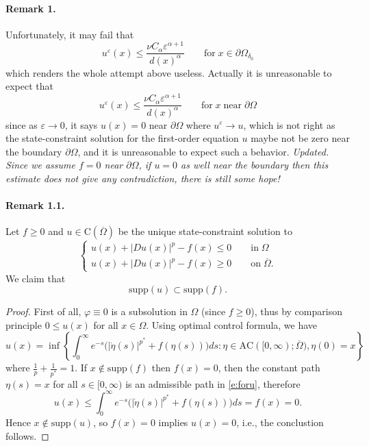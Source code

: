\documentclass[10pt]{article}
\theoremstyle{plain}
\theoremstyle{remark}
\begin{document}
\paragraph{Remark 1.} Unfortunately, it may fail that
\begin{equation*}
    u^\varepsilon(x) \leq  \frac{\nu C_\alpha \varepsilon^{\alpha+1}}{d(x)^\alpha} \qquad\text{for}\;x\in \partial\Omega_{\delta_0}
\end{equation*}
which renders the whole attempt above useless. Actually it is unreasonable to expect that
\begin{equation*}
    u^\varepsilon(x)\leq \frac{\nu C_\alpha \varepsilon^{\alpha+1}}{d(x)^\alpha} \qquad\text{for}\;x\;\text{near}\;\partial \Omega
\end{equation*}
since as $\varepsilon\to 0$, it says $u(x) = 0$ near $\partial\Omega$ where $u^\varepsilon\to u$, which is not right as the state-constraint solution for the first-order equation $u$ maybe not be zero near the boundary $\partial\Omega$, and it is unreasonable to expect such a behavior. \emph{Updated. Since we assume $f = 0$ near $\partial\Omega$, if $u = 0$ as well near the boundary then this estimate does not give any contradiction, there is still some hope!}

\paragraph{Remark 1.1.} Let $f\geq 0$ and $u\in \mathrm{C}(\overline{\Omega})$ be the unique state-constraint solution to
\begin{equation*}
    \begin{cases}
       u(x) + |Du(x)|^p - f(x) \leq 0 \qquad\text{in}\;\Omega\\
       u(x) + |Du(x)|^p - f(x) \geq 0 \qquad\text{on}\;\overline{\Omega}.
    \end{cases}
\end{equation*}
We claim that 
\begin{equation*}
    \mathrm{supp}(u)\subset \mathrm{supp}(f).
\end{equation*}
\begin{proof} First of all, $\varphi \equiv 0$ is a subsolution in $\Omega$ (since $f\geq 0$), thus by comparison principle $0\leq u(x)$ for all $x\in \Omega$. Using optimal control formula, we have
\begin{equation}\label{e:foru}
    u(x) = \inf \left\lbrace \int_0^\infty e^{-s}\Big(|\dot{\eta}(s)|^{p^*} +f(\eta(s))\Big)ds: \eta\in \mathrm{AC}([0,\infty);\overline{\Omega}), \eta(0) = x\right\rbrace
\end{equation}
where $\frac{1}{p} + \frac{1}{p^*} = 1$. If $x\notin \mathrm{supp}(f)$ then $f(x) = 0$, then the constant path $\eta(s) = x$ for all $s\in [0,\infty)$ is an admissible path in \eqref{e:foru}, therefore
\begin{equation*}
    u(x) \leq  \int_0^\infty e^{-s}\Big(|\dot{\eta}(s)|^{p^*} +f(\eta(s))\Big)ds = f(x) =  0.
\end{equation*}
Hence $x\notin \mathrm{supp}(u)$, so $f(x) = 0$ implies $u(x) = 0$, i.e., the conclustion follows.
\end{proof}
\end{document}
